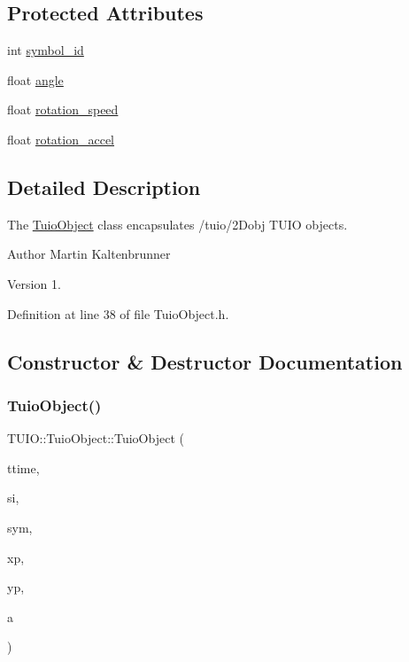 \subsection*{Protected Attributes}
\begin{DoxyCompactItemize}
\item 
int \hyperlink{class_t_u_i_o_1_1_tuio_object_a05c245f10efaa7bf97b6c383004d6b7f}{symbol\+\_\+id}
\item 
float \hyperlink{class_t_u_i_o_1_1_tuio_object_a1c5652a3ee1175156f13777f0d8068ee}{angle}
\item 
float \hyperlink{class_t_u_i_o_1_1_tuio_object_aee8d80d314a66646b834b2d74e0073d1}{rotation\+\_\+speed}
\item 
float \hyperlink{class_t_u_i_o_1_1_tuio_object_a793a29a0bf9fd2f1becdb9d2d45fc463}{rotation\+\_\+accel}
\end{DoxyCompactItemize}


\subsection{Detailed Description}
The \hyperlink{class_t_u_i_o_1_1_tuio_object}{Tuio\+Object} class encapsulates /tuio/2\+Dobj T\+U\+IO objects.

\begin{DoxyAuthor}{Author}
Martin Kaltenbrunner 
\end{DoxyAuthor}
\begin{DoxyVersion}{Version}
1. 
\end{DoxyVersion}


Definition at line 38 of file Tuio\+Object.\+h.



\subsection{Constructor \& Destructor Documentation}
\mbox{\label{class_t_u_i_o_1_1_tuio_object_a25b1ce53c045514fcef6c99afc23ca26}} 
\subsubsection{\texorpdfstring{Tuio\+Object()}{TuioObject()}\hspace{0.1cm}{\footnotesize\ttfamily [1/3]}}
{\footnotesize\ttfamily T\+U\+I\+O\+::\+Tuio\+Object\+::\+Tuio\+Object (\begin{DoxyParamCaption}\item[{\hyperlink{class_t_u_i_o_1_1_tuio_time}{Tuio\+Time}}]{ttime,  }\item[{long}]{si,  }\item[{int}]{sym,  }\item[{float}]{xp,  }\item[{float}]{yp,  }\item[{float}]{a }\end{DoxyParamCaption})\hspace{0.3cm}{\ttfamily [inline]}}

